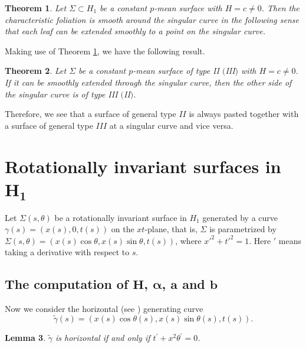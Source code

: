 \documentclass[pdftex]{sigma}
\numberwithin{equation}{section}
\newtheorem{Theorem}{Theorem}[section]
\newtheorem{Lemma}[Theorem]{Lemma}
\begin{document}
\begin{Theorem}\label{theo2}
Let $\Sigma\subset H_{1}$ be a constant $p$-mean surface with $H=c\neq 0$. Then the characteristic foliation is smooth around the singular curve in the following sense that each leaf can be extended smoothly to a point on the singular curve.
\end{Theorem}

Making use of Theorem \ref{theo2}, we have the following result.
\begin{Theorem}\label{main10}
Let $\Sigma$ be a constant $p$-mean surface of type II $($III$)$ with $H=c\neq 0$. If it can be smoothly extended through the singular curve, then the other side of the singular curve is of type III $($II$)$.
\end{Theorem}

Therefore, we see that a surface of general type $II$ is always pasted together with a surface of general type $III$ at a singular curve and vice versa.


\section[Rotationally invariant surfaces in H\_1]{Rotationally invariant surfaces in $\boldsymbol{ H_1}$}

Let $\Sigma(s,\theta)$ be a rotationally invariant surface in $H_1$
generated by a curve $\gamma(s)=(x(s),0,t(s))$ on the $xt$-plane,
that is, $\Sigma$ is parametrized by
$
\Sigma(s,\theta)=(x(s)\cos \theta,x(s)\sin \theta,t(s))$,
where ${x'^{2}+t'^{2}=1}$. Here $'$ means taking a derivative with respect to $s$.

\subsection[The computation of H, alpha, a and b]{The computation of $\boldsymbol{H}$, $\boldsymbol{\alpha}$, $\boldsymbol{a}$ and $\boldsymbol{b}$}

Now we consider the horizontal (see \cite[Definition 1.1]{ChiuH/HuangY/LaiS:2017}) generating curve
\[
\tilde{\gamma}(s)=(x(s)\cos \theta(s),x(s)\sin \theta(s),t(s)).
\]

\begin{Lemma}
$\tilde{\gamma}$ is horizontal if and only if $t^{\prime}+x^{2}\theta^{\prime}=0$.
\end{Lemma}
\end{document}
